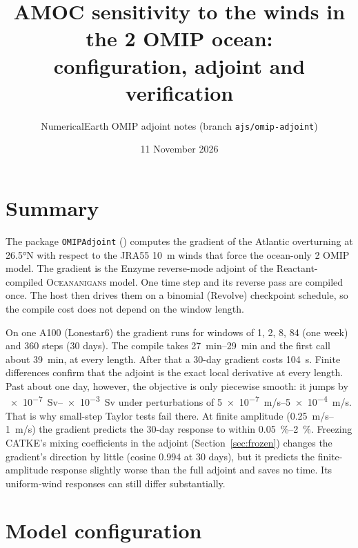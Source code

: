 \documentclass[11pt]{article}
\title{\textbf{AMOC sensitivity to the winds in the 2\textdegree{} OMIP ocean}:\\
       configuration, adjoint and verification}
\author{NumericalEarth OMIP adjoint notes (branch \texttt{ajs/omip-adjoint})}
\date{11 November 2026}
\begin{document}
\maketitle

\section{Summary}

The package \texttt{OMIPAdjoint} () computes the gradient of
the Atlantic overturning at \ang{26.5}N with respect to the JRA55 \SI{10}{m} winds that force the
ocean-only 2\textdegree{} OMIP model. The gradient is the Enzyme reverse-mode adjoint of the
Reactant-compiled \textsc{Oceananigans} model. One time step and its reverse pass are compiled once.
The host then drives them on a binomial (Revolve) checkpoint schedule, so the compile cost does not
depend on the window length.

On one A100 (Lonestar6) the gradient runs for windows of 1, 2, 8, 84 (one week) and 360 steps (30 days).
The compile takes \SIrange{27}{29}{min} and the first call about \SI{39}{min}, at every length.
After that a 30-day gradient costs \SI{104}{s}. Finite differences confirm that the adjoint is the exact
local derivative at every length. Past about one day, however, the objective is only piecewise smooth:
it jumps by \SIrange{e-7}{e-3}{Sv} under perturbations of \SIrange{5e-7}{5e-4}{m/s}. That is why
small-step Taylor tests fail there. At finite amplitude (\SIrange{0.25}{1}{m/s}) the gradient predicts
the 30-day response to within \SIrange{0.05}{2}{\percent}. Freezing CATKE's mixing coefficients in the
adjoint (Section~\ref{sec:frozen}) changes the gradient's direction by little (cosine \num{0.994} at 30
days), but it predicts the finite-amplitude response slightly worse than the full adjoint and saves no
time. Its uniform-wind responses can still differ substantially.

\section{Model configuration}
\end{document}
